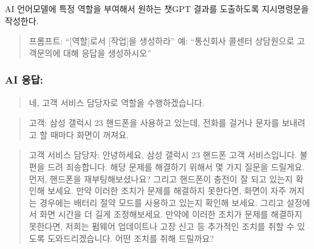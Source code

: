 \documentclass[
  letterpaper,
]{book}
\begin{document}
AI 언어모델에 특정 역할을 부여해서 원하는 챗GPT 결과를 도출하도록
지시명령문을 작성한다.

\begin{quote}
프롬프트: ``{[}역할{]}로서 {[}작업{]}을 생성하라'' 예: ``통신회사 콜센터
상담원으로 고객문의에 대해 응답을 생성하시오''
\end{quote}

\begin{tcolorbox}[enhanced jigsaw, opacityback=0, opacitybacktitle=0.6, colback=white, rightrule=.15mm, coltitle=black, colframe=quarto-callout-note-color-frame, colbacktitle=quarto-callout-note-color!10!white, bottomrule=.15mm, bottomtitle=1mm, breakable, title=\textcolor{quarto-callout-note-color}{\faInfo}\hspace{0.5em}{프롬프트: 너는 지금부터 케이블 TV 회사의 고객 서비스 담당자로 역할을
수행할 것입니다. 고객이 콜센터로 삼성 갤럭시 23 핸드폰에 문제가 있다고
전화를 걸어왔습니다. 고객에게 응대를 해야하는데 어떻게 응대할지
작성해보세요.}, titlerule=0mm, leftrule=.75mm, toptitle=1mm, left=2mm, arc=.35mm, toprule=.15mm]

\hypertarget{ai-uxc751uxb2f5-2}{%
\subsubsection*{AI 응답:}\label{ai-uxc751uxb2f5-2}}

\begin{quote}
네, 고객 서비스 담당자로 역할을 수행하겠습니다.
\end{quote}

\begin{quote}
고객: 삼성 갤럭시 23 핸드폰을 사용하고 있는데, 전화를 걸거나 문자를
보내려고 할 때마다 화면이 꺼져요.
\end{quote}

\begin{quote}
고객 서비스 담당자: 안녕하세요, 삼성 갤럭시 23 핸드폰 고객 서비스입니다.
불편을 드려 죄송합니다. 해당 문제를 해결하기 위해서 몇 가지 질문을
드릴게요. 먼저, 핸드폰을 재부팅해보셨나요? 그리고 핸드폰이 충전이 잘
되고 있는지 확인해 보세요. 만약 이러한 조치가 문제를 해결하지 못한다면,
화면이 자주 꺼지는 경우에는 배터리 절약 모드를 사용하고 있는지 확인해
보세요. 그리고 설정에서 화면 시간을 더 길게 조정해보세요. 만약에 이러한
조치가 문제를 해결하지 못한다면, 저희는 펌웨어 업데이트나 고장 신고 등
추가적인 조치를 취할 수 있도록 도와드리겠습니다. 어떤 조치를 취해
드릴까요?
\end{quote}

\end{tcolorbox}
\end{document}

